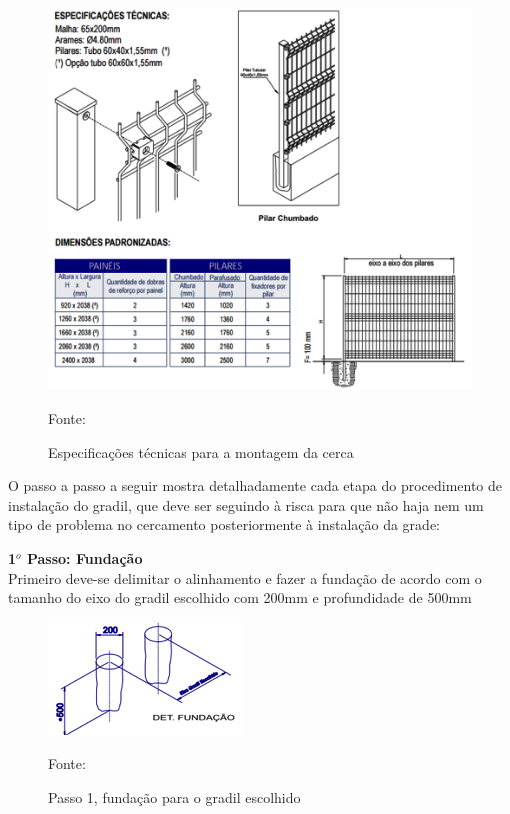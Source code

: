 \begin{figure}[h!]
	\centering
	\label{EspecificacoesTecnicasCerca}
		\includegraphics[keepaspectratio=true,scale=0.8]{figuras/EspecificacoesTecnicasCerca.png}
	\caption{Especifica\c{c}\~oes t\'ecnicas para a montagem da cerca}
	\small{Fonte: \cite{CatalogoCercamento}}
\end{figure}

O passo a passo a seguir mostra detalhadamente cada etapa do procedimento de instala\c{c}\~ao do gradil, que deve ser seguindo \`a risca para que n\~ao haja nem um tipo de problema no cercamento posteriormente \`a instala\c{c}\~ao da grade: 

\textbf{1$^{o}$ Passo: Funda\c{c}\~ao} \\ Primeiro deve-se delimitar o alinhamento e fazer a funda\c{c}\~ao de acordo com o tamanho do eixo do gradil escolhido com 200mm e profundidade de 500mm

\begin{figure}[h!]
	\centering
	\label{GradilEscolhido}
		\includegraphics[keepaspectratio=true,scale=0.9]{figuras/GradilEscolhido.png}
	\caption{Passo 1, funda\c{c}\~ao para o gradil escolhido}
	\small{Fonte: \cite{CatalogoCercamento}}
\end{figure}

